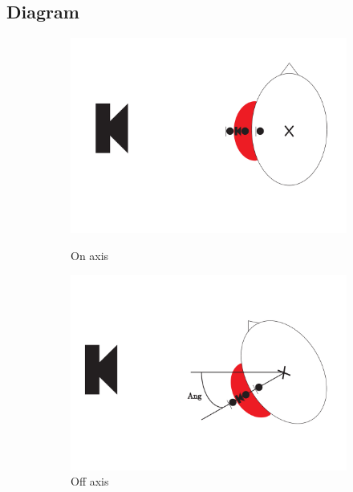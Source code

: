 \subsection{Diagram}
\begin{figure}[H]
	\centering
	\begin{subfigure}[b]{.4\textwidth}
		\includegraphics[width=\textwidth]{../Journal/Experiments/AngleOfIncidence/AngleOfIncidenceOnAxis.pdf}
		\caption{On axis}
		\label{fig:AngOfIndOnax}
		\vspace{2ex}
		\includegraphics[width=\textwidth]{../Journal/Experiments/AngleOfIncidence/AngleOfIncidenceOffAxis.pdf}
		\caption{Off axis}
		\label{fig:AngOfIndOffax}
	\end{subfigure} 
	\begin{subfigure}[b]{.4\textwidth}
	\centering

\end{subfigure}
\end{figure}
